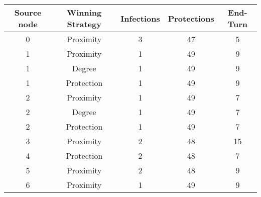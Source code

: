 \documentclass[results.tex]{subfiles}
\begin{document}
    \begin{center}
        \begin{tabular}{| c || c | c | c | c |}
            \hline
            {\bfseries Source node} & {\bfseries Winning Strategy} & {\bfseries Infections} & {\bfseries Protections}
            & {\bfseries End-Turn}
            \\  %
            \hline\hline
            0                       & Proximity                    & 3                      & 47                      & 5                    \\
            \hline
            1                       & Proximity                    & 1                      & 49                      & 9                    \\
            \hline
            1                       & Degree                       & 1                      & 49                      & 9                    \\
            \hline
            1                       & Protection                   & 1                      & 49                      & 9                    \\
            \hline
            2                       & Proximity                    & 1                      & 49                      & 7                    \\
            \hline
            2                       & Degree                       & 1                      & 49                      & 7                    \\
            \hline
            2                       & Protection                   & 1                      & 49                      & 7                    \\
            \hline
            3                       & Proximity                    & 2                      & 48                      & 15                   \\
            \hline
            4                       & Protection                   & 2                      & 48                      & 7                    \\
            \hline
            5                       & Proximity                    & 2                      & 48                      & 9                    \\
            \hline
            6                       & Proximity                    & 1                      & 49                      & 9                    \\

\end{tabular}
\end{center}
\end{document}
